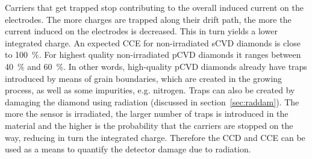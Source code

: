 Carriers that get trapped stop contributing to the overall induced current on the electrodes. The more charges are trapped along their drift path, the more the current induced on the electrodes is decreased. This in turn yields a lower integrated charge. 
An expected CCE for non-irradiated sCVD diamonds is close to 100~\%. For highest quality non-irradiated pCVD diamonds it ranges between 40~\% and 60~\%. In other words, high-quality pCVD diamonds already have traps introduced by means of grain boundaries, which are created in the growing process, as well as some impurities, e.g. nitrogen. Traps can also be created by damaging the diamond using radiation (discussed in section~\ref{sec:raddam}). The more the sensor is irradiated, the larger number of traps is introduced in the material and the higher is the probability that the carriers are stopped on the way, reducing in turn the integrated charge. Therefore the CCD and CCE can be used as a means to quantify the detector damage due to radiation.

